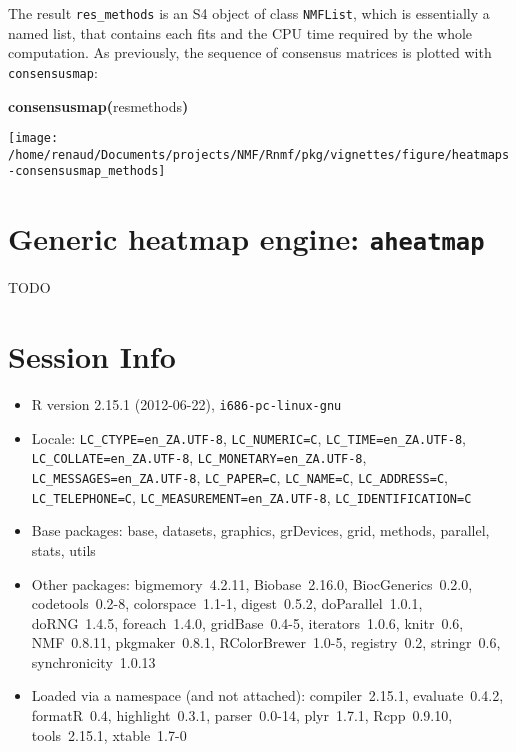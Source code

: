\documentclass[a4paper]{article}\usepackage{graphicx, color}
\makeatletter
\def\maxwidth{ %
  \ifdim\Gin@nat@width>\linewidth
    \linewidth
  \else
    \Gin@nat@width
  \fi
}
\newcommand{\hlfunctioncall}[1]{\textcolor[rgb]{0.501960784313725,0,0.329411764705882}{\textbf{#1}}}%
\newcommand{\hlkeyword}[1]{\textcolor[rgb]{0,0,0}{\textbf{#1}}}%
\newcommand{\hlsymbol}[1]{\textcolor[rgb]{0,0,0}{#1}}%
\newenvironment{kframe}{%
 \def\FrameCommand##1{\hskip\@totalleftmargin \hskip-\fboxsep
 \colorbox{shadecolor}{##1}\hskip-\fboxsep
     \hskip-\linewidth \hskip-\@totalleftmargin \hskip\columnwidth}%
 \MakeFramed {\advance\hsize-\width
   \@totalleftmargin\z@ \linewidth\hsize
   \@setminipage}}%
 {\par\unskip\endMakeFramed}
\newenvironment{knitrout}{}{} %
\let\code=\texttt
\makeatother
\begin{document}
The result \code{res\_methods} is an S4 object of class \code{NMFList}, which 
is essentially a named list, that contains each fits and the CPU time required 
by the whole computation.
As previously, the sequence of consensus matrices is plotted with \code{consensusmap}:

\begin{knitrout}
\color{fgcolor}\begin{kframe}
\begin{flushleft}
\ttfamily\noindent
\hlfunctioncall{consensusmap}\hlkeyword{(}\hlsymbol{res\usebox{\hlnormalsizeboxunderscore}methods}\hlkeyword{)}\mbox{}
\normalfont
\end{flushleft}
\end{kframe}\texttt{[image: /home/renaud/Documents/projects/NMF/Rnmf/pkg/vignettes/figure/heatmaps-consensusmap\_methods]} 
\end{knitrout}


\section{Generic heatmap engine: \texttt{aheatmap}}
\label{sec:aheatmap}

TODO

\section{Session Info}

\begin{itemize}\raggedright
  \item R version 2.15.1 (2012-06-22), \verb|i686-pc-linux-gnu|
  \item Locale: \verb|LC_CTYPE=en_ZA.UTF-8|, \verb|LC_NUMERIC=C|, \verb|LC_TIME=en_ZA.UTF-8|, \verb|LC_COLLATE=en_ZA.UTF-8|, \verb|LC_MONETARY=en_ZA.UTF-8|, \verb|LC_MESSAGES=en_ZA.UTF-8|, \verb|LC_PAPER=C|, \verb|LC_NAME=C|, \verb|LC_ADDRESS=C|, \verb|LC_TELEPHONE=C|, \verb|LC_MEASUREMENT=en_ZA.UTF-8|, \verb|LC_IDENTIFICATION=C|
  \item Base packages: base, datasets, graphics, grDevices, grid,
    methods, parallel, stats, utils
  \item Other packages: bigmemory~4.2.11, Biobase~2.16.0,
    BiocGenerics~0.2.0, codetools~0.2-8, colorspace~1.1-1,
    digest~0.5.2, doParallel~1.0.1, doRNG~1.4.5, foreach~1.4.0,
    gridBase~0.4-5, iterators~1.0.6, knitr~0.6, NMF~0.8.11,
    pkgmaker~0.8.1, RColorBrewer~1.0-5, registry~0.2, stringr~0.6,
    synchronicity~1.0.13
  \item Loaded via a namespace (and not attached):
    compiler~2.15.1, evaluate~0.4.2, formatR~0.4, highlight~0.3.1,
    parser~0.0-14, plyr~1.7.1, Rcpp~0.9.10, tools~2.15.1,
    xtable~1.7-0
\end{itemize}




\printbibliography[heading=bibintoc]
\end{document}
